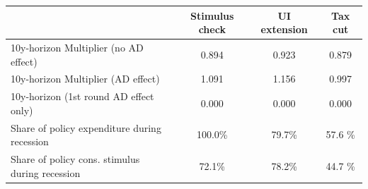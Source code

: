 \begin{tabular}{@{}lccc@{}} 
\toprule 
& Stimulus check    & UI extension    & Tax cut     \\  \midrule 
10y-horizon Multiplier (no AD effect) &0.894  & 0.923  & 0.879     \\ 
10y-horizon Multiplier (AD effect) &1.091  & 1.156  & 0.997     \\ 
10y-horizon (1st round AD effect only) &0.000  & 0.000  & 0.000     \\ 
Share of policy expenditure during recession &100.0\%  & 79.7\%  & 57.6 \%    \\ 
Share of policy cons. stimulus during recession &72.1\%  & 78.2\%  & 44.7 \%    \\ \bottomrule 
\end{tabular}  
